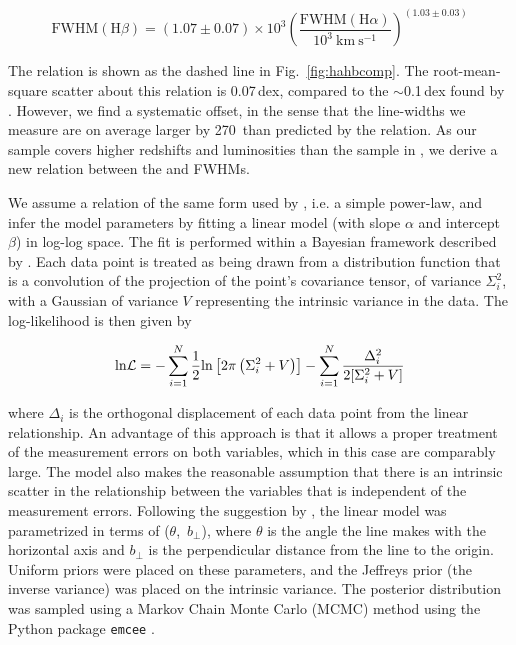 \begin{equation}
  \mathrm{FWHM}(\mathrm{H}\beta) = \left( 1.07 \pm 0.07 \right) \times 10^3 \left( \frac{ \mathrm{FWHM}(\mathrm{H}\alpha) }{10^3 ~\mathrm{km}~\mathrm{s}^{-1} } \right)^{(1.03 \pm 0.03)}
\end{equation}

The relation is shown as the dashed line in Fig.~\ref{fig:hahbcomp}.
The root-mean-square scatter about this relation is 0.07\,dex, compared to the $\sim$0.1\,dex found by \citet{greene05}. 
However, we find a systematic offset, in the sense that the \hb line-widths we measure are on average larger by 270\kms\, than predicted by the \citet{greene05} relation. 
As our sample covers higher redshifts and luminosities than the sample in \citet{greene05}, we derive a new relation between the \ha and \hb FWHMs.       

We assume a relation of the same form used by \citet{greene05}, i.e. a simple power-law, and infer the model parameters by fitting a linear model (with slope $\alpha$ and intercept $\beta$) in log-log space.
The fit is performed within a Bayesian framework described by \citet{hogg10}. 
Each data point is treated as being drawn from a distribution function that is a convolution of the projection of the point's covariance tensor, of variance $\Sigma_i^2$, with a Gaussian of variance $V$ representing the intrinsic variance in the data.
The log-likelihood is then given by 

\begin{equation}
  {\rm ln} {\cal L} = - \sum_{i=1}^N \frac{1}{2} {\rm ln}\left[2\pi\left(\Sigma_i^2 + V\right)\right] - \sum_{i=1}^N \frac{\Delta_i^2}{2[\Sigma_i^2 + V]} 
\end{equation}

\noindent where $\Delta_i$ is the orthogonal displacement of each data point from the linear relationship. 
An advantage of this approach is that it allows a proper treatment of the measurement errors on both variables, which in this case are comparably large.
The model also makes the reasonable assumption that there is an intrinsic scatter in the relationship between the variables that is independent of the measurement errors.  
Following the suggestion by \citet{hogg10}, the linear model was parametrized in terms of ($\theta$,~$b_\bot$), where $\theta$ is the angle the line makes with the horizontal axis and $b_\bot$ is the perpendicular distance from the line to the origin.
Uniform priors were placed on these parameters, and the Jeffreys prior (the inverse variance) was placed on the intrinsic variance. 
The posterior distribution was sampled using a Markov Chain Monte Carlo (MCMC) method using the Python package {\tt emcee} \citep{foreman13}. 
 
